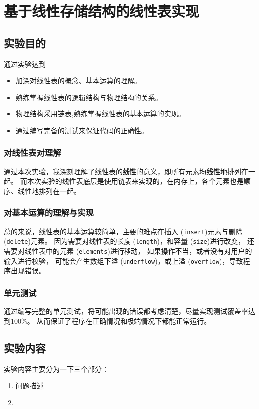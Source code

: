 \chapter{基于线性存储结构的线性表实现}\label{chapter:1}

\section{实验目的}\label{sec:1}
通过实验达到
\begin{itemize}
    \item 加深对线性表的概念、基本运算的理解。
    \item 熟练掌握线性表的逻辑结构与物理结构的关系。
    \item 物理结构采用链表,熟练掌握线性表的基本运算的实现。
    \item 通过编写完备的测试来保证代码的正确性。
\end{itemize}

\subsection{对线性表对理解}
通过本次实验，我深刻理解了线性表的\textbf{线性}的意义，即所有元素均\textbf{线性}地排列在一起。
\newline
而本次实验的线性表底层是使用链表来实现的，在内存上，各个元素也是顺序、线性地排列在一起。
\subsection{对基本运算的理解与实现}
总的来说，线性表的基本运算较简单，主要的难点在插入 (\texttt{insert})元素与删除 (\texttt{delete})元素。
因为需要对线性表的长度 (\texttt{length})，和容量 (\texttt{size})进行改变，
还需要对线性表中的元素 (\texttt{elements})进行移动，
如果操作不当，或者没有对用户的输入进行校验，
可能会产生数组下溢 (\texttt{underflow})，或上溢 (\texttt{overflow})，导致程序出现错误。
\subsection{单元测试}
通过编写完整的单元测试，将可能出现的错误都考虑清楚，尽量实现测试覆盖率达到100\%。
从而保证了程序在正确情况和极端情况下都能正常运行。


\section{实验内容}\label{sec:2}
    实验内容主要分为一下三个部分：
\begin{enumerate}
    \item 问题描述
    \item 
\end{enumerate}
